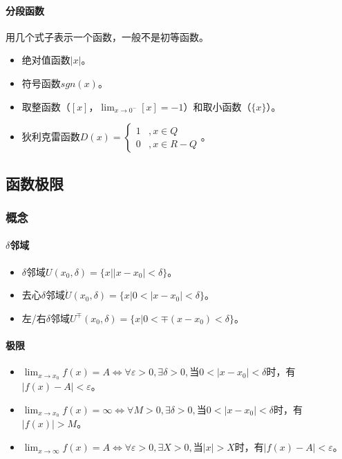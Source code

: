 \documentclass[
12pt, %
a4paper, 
oneside, %
headinclude,footinclude, %
]{scrartcl}
\begin{document}
\paragraph{分段函数}
用几个式子表示一个函数，一般不是初等函数。
\begin{itemize}
\item 绝对值函数$ |x| $。
\item 符号函数$ sgn(x) $。
\item 取整函数（$ [x] $，$ \lim_{x \to 0^-} [x] = -1 $）和取小函数（$ \{x\} $）。
\item 狄利克雷函数$ D(x)= \begin{cases} 1 &, x \in Q \\ 0 &, x \in R-Q \end{cases} $。
\end{itemize}
\subsection[函数极限]{函数极限}
\subsubsection[概念]{概念}
\paragraph{$ \delta $邻域}
\begin{itemize}
\item $ \delta $邻域$ U(x_0, \delta) = \{x||x - x_0| < \delta\} $。
\item 去心$ \delta $邻域$ \mathring{U}(x_0, \delta) = \{x|0 < |x -x _0| < \delta\} $。
\item 左/右$ \delta $邻域$ U^{\mp}(x_0, \delta) = \{x|0 < \mp (x - x_0) < \delta\} $。
\end{itemize}
\paragraph{极限}
\begin{itemize}
\item $ \lim_{x \to x_0} f(x) = A \Leftrightarrow \forall \varepsilon > 0, \exists \delta > 0, $当$ 0 < |x - x_0|< \delta $时，有$ |f(x) - A| < \varepsilon $。
\item $ \lim_{x \to x_0} f(x) = \infty \Leftrightarrow \forall M > 0, \exists \delta > 0, $当$ 0 < |x - x_0|< \delta $时，有$ |f(x)| > M $。
\item $ \lim_{x \to \infty} f(x) = A \Leftrightarrow \forall \varepsilon > 0, \exists X > 0, $当$ |x|> X $时，有$ |f(x) - A| < \varepsilon $。
\end{itemize}
\end{document}
